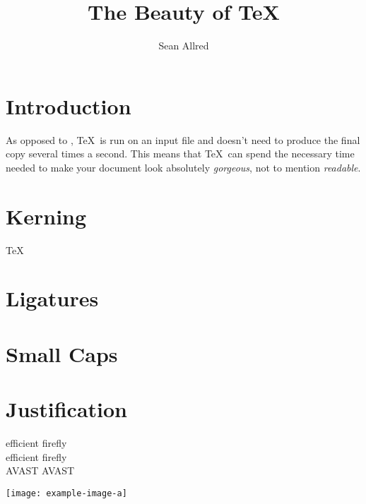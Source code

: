 \documentclass{article}
\title{The Beauty of \TeX}
\author{Sean Allred}
\begin{document}
\maketitle
\tableofcontents

\section{Introduction}
\label{sec:introduction}

As opposed to \MicrosoftWord,
  \TeX\ is run on an input file and
  doesn't need to produce the final copy
  several times a second.
This means that \TeX\ can spend
  the necessary time needed
  to make your document
  look absolutely \emph{gorgeous},
  not to mention \emph{readable}.

\section{Kerning}
\label{sec:kerning}

\TeX\ 

\section{Ligatures}
\label{sec:ligatures}

\section{Small Caps}
\label{sec:small-caps}

\section{Justification}
\label{sec:justification}



efficient firefly \\
ef{}f{}icient f{}iref{}ly\\
AVAST A{}VAST

\lipsum
\texttt{[image: example-image-a]}
\end{document}
